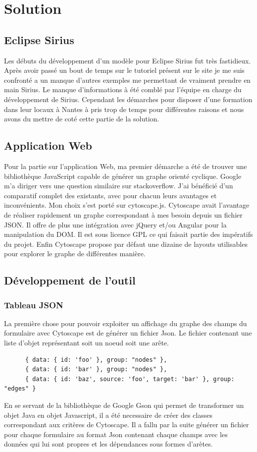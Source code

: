 \chapter{Solution}

\section{Eclipse Sirius}
Les débuts du développement d’un modèle pour Eclipse Sirius fut très fastidieux. Après avoir passé un bout de temps sur le tutoriel présent sur le site je me suis confronté a un manque d’autres exemples me permettant de vraiment prendre en main Sirius. Le manque d'informations à été comblé par l'équipe en charge du développement de Sirius. Cependant les démarches pour disposer d'une formation dans leur locaux à Nantes à pris trop de temps pour différentes raisons et nous avons du mettre de coté cette partie de la solution.

\section{Application Web}
Pour la partie sur l'application Web, ma premier démarche a été de trouver une bibliothèque JavaScript capable de générer un graphe orienté cyclique. Google m’a diriger vers une question similaire sur stackoverflow. J’ai bénéficié d'un comparatif complet des existants, avec pour chacun leurs avantages et inconvénients. Mon choix s’est porté sur cytoscape.js. Cytoscape avait l’avantage de réaliser rapidement un graphe correspondant à mes besoin depuis un fichier JSON. Il offre de plus une intégration avec jQuery et/ou Angular pour la manipulation du DOM. Il est sous licence GPL ce qui faisait partie des impératifs du projet. Enfin Cytoscape propose par défaut une dizaine de layouts utilisables pour explorer le graphe de différentes manière.
\clearpage
\section{Développement de l'outil}

\subsection{Tableau JSON}
La première chose pour pouvoir exploiter un affichage du graphe des champs du formulaire avec Cytoscape est de générer un fichier Json. Le fichier contenant une liste d'objet représentant soit un noeud soit une arête. 
\begin{lstlisting}
      { data: { id: 'foo' }, group: "nodes" },
      { data: { id: 'bar' }, group: "nodes" },
      { data: { id: 'baz', source: 'foo', target: 'bar' }, group: "edges" }
\end{lstlisting}
En se servant de la bibliothèque de Google Gson qui permet de transformer un objet Java en objet Javascript, il a été necessaire de créer des classes correspondant aux critères de Cytoscape. Il a fallu par la suite générer un fichier pour chaque formulaire au format Json contenant chaque champs avec les données qui lui sont propres et les dépendances sous formes d'arètes.

